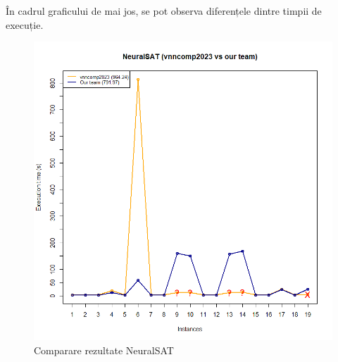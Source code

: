 În cadrul graficului de mai jos, se pot observa diferențele dintre timpii de execuție.
\begin{figure}[h]
\centering 
\includegraphics[width=0.8\linewidth]{imagini/interpretare rezultate/NeuralSAT_us_vs_vnncomp2023.png}
\caption{Comparare rezultate NeuralSAT}
\label{fig:image4} 
\end{figure}
\